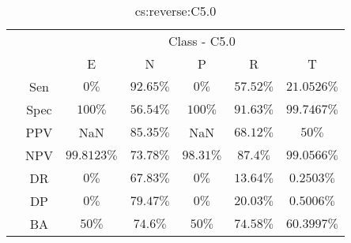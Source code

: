 \begin{table}[!ht]
	\centering
	\begin{tabular}{|c|c|c|c|c|c|c|}
		\cline{3-7}
		\multicolumn{2}{c|}{} & \multicolumn{5}{c|}{Class - C5.0} \\ \cline{3-7}
		\multicolumn{2}{c|}{} & E & N & P & R & T \\ \hline
		\multirow{7}{*}{\rotatebox{90}{Statistics}} & Sen & $0\%$ & $92.65\%$ & $0\%$ & $57.52\%$ & $21.0526\%$ \\ \cline{2-7}
		 & Spec & $100\%$ & $56.54\%$ & $100\%$ & $91.63\%$ & $99.7467\%$ \\ \cline{2-7}
		 & PPV & NaN & $85.35\%$ & NaN & $68.12\%$ & $50\%$ \\ \cline{2-7}
		 & NPV & $99.8123\%$ & $73.78\%$ & $98.31\%$ & $87.4\%$ & $99.0566\%$ \\ \cline{2-7}
		 & DR & $0\%$ & $67.83\%$ & $0\%$ & $13.64\%$ & $0.2503\%$ \\ \cline{2-7}
		 & DP & $0\%$ & $79.47\%$ & $0\%$ & $20.03\%$ & $0.5006\%$ \\ \cline{2-7}
		 & BA & $50\%$ & $74.6\%$ & $50\%$ & $74.58\%$ & $60.3997\%$ \\ \hline
	\end{tabular}
	\caption{cs:reverse:C5.0}
	\label{tab:cs:reverse:C5.0}
\end{table}
